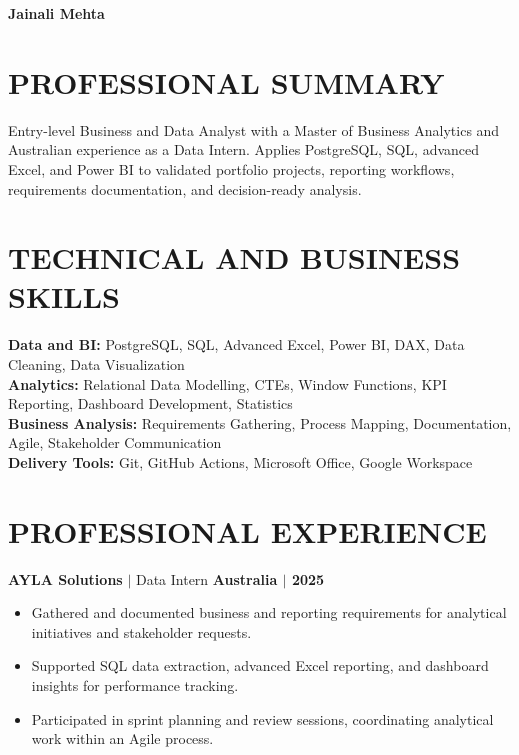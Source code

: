 \documentclass[letterpaper,10pt]{article}
\newcommand{\role}[4]{\textbf{#1} $\vert$ #2 \hfill \textbf{#3 $\vert$ #4}\par\vspace{-1pt}}
\begin{document}
\fontsize{10.1}{11.7}\selectfont

\begin{center}
  {\fontsize{21}{23}\selectfont\bfseries\color{navy} Jainali Mehta}\par
  \par
\end{center}
\vspace{-6pt}

\section*{PROFESSIONAL SUMMARY}
Entry-level Business and Data Analyst with a Master of Business Analytics and Australian experience as a Data Intern. Applies PostgreSQL, SQL, advanced Excel, and Power BI to validated portfolio projects, reporting workflows, requirements documentation, and decision-ready analysis.

\section*{TECHNICAL AND BUSINESS SKILLS}
\textbf{Data and BI:} PostgreSQL, SQL, Advanced Excel, Power BI, DAX, Data Cleaning, Data Visualization\\
\textbf{Analytics:} Relational Data Modelling, CTEs, Window Functions, KPI Reporting, Dashboard Development, Statistics\\
\textbf{Business Analysis:} Requirements Gathering, Process Mapping, Documentation, Agile, Stakeholder Communication\\
\textbf{Delivery Tools:} Git, GitHub Actions, Microsoft Office, Google Workspace

\section*{PROFESSIONAL EXPERIENCE}
\role{AYLA Solutions}{Data Intern}{Australia}{2025}
\begin{itemize}
  \item Gathered and documented business and reporting requirements for analytical initiatives and stakeholder requests.
  \item Supported SQL data extraction, advanced Excel reporting, and dashboard insights for performance tracking.
  \item Participated in sprint planning and review sessions, coordinating analytical work within an Agile process.
\end{itemize}
\end{document}
